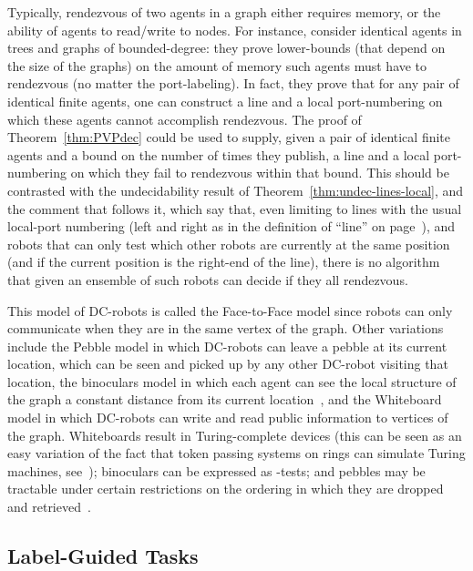 \begin{example}[Rendezvous]
Typically, rendezvous of two agents in a graph either requires memory, or the ability of agents to read/write to nodes. For instance, \cite{DBLP:conf/wdag/FraigniaudP08} consider identical agents in trees and graphs of bounded-degree: they prove lower-bounds (that depend on the size of the graphs) on the amount of memory such agents must have to rendezvous (no matter the port-labeling). In fact, they prove that for any pair of identical finite agents, one can construct a line and a local port-numbering on which
these agents cannot accomplish rendezvous. The proof of Theorem~\ref{thm:PVPdec} could be used to supply, given a pair of identical finite agents and a bound on the number of times they publish, a line and a local port-numbering on which they fail to rendezvous within that bound. This should be contrasted with the undecidability result of Theorem~\ref{thm:undec-lines-local}, and the comment that follows it, which say that, even limiting to lines with the usual local-port numbering (left and right as in the definition of ``line'' on page~\pageref{def:line}), and robots that can only test which other robots are currently at the same position (and if the current position is the right-end of the line), there is no algorithm that given an ensemble of such robots can decide if they all rendezvous. 
\end{example}

This model of DC-robots is called the Face-to-Face model since robots can only communicate when they are in the same vertex of the graph. Other variations include the Pebble model in which DC-robots can leave a pebble at its current location, which can be seen and picked up by any other DC-robot visiting that location, the binoculars model in which each agent can see the local structure of the graph a constant distance from its current location~\cite{DBLP:conf/wdag/ChalopinGN15}, and the Whiteboard model in which DC-robots can write and read public information to vertices of the graph. Whiteboards result in Turing-complete devices (this can be seen as an easy variation of the fact that token passing systems on rings can simulate Turing machines, see~\cite{Suzuki}); binoculars can be expressed as \msol-tests; and pebbles may be tractable under certain restrictions on the ordering in which they are dropped and retrieved~\cite{EnHo06}.


\iffalse
\subsection{Label-Guided Tasks}

